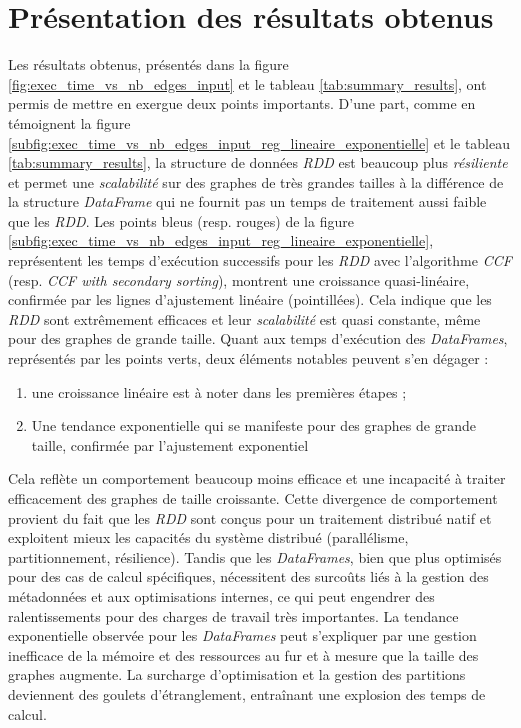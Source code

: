 \documentclass[conference]{IEEEtran}
\begin{document}
\section{Présentation des résultats obtenus}

Les résultats obtenus, présentés dans la figure \ref{fig:exec_time_vs_nb_edges_input} et le tableau \ref{tab:summary_results}, ont permis de mettre en exergue deux points importants.
D'une part, comme en témoignent la figure \ref{subfig:exec_time_vs_nb_edges_input_reg_lineaire_exponentielle} et le tableau \ref{tab:summary_results}, la structure de données \textit{RDD} est beaucoup plus \textit{résiliente} et permet une \textit{scalabilité} sur des graphes de très grandes tailles à la différence de la structure \textit{DataFrame} qui ne fournit pas un temps de traitement aussi faible que les \textit{RDD}.
Les points bleus (resp. rouges) de la figure \ref{subfig:exec_time_vs_nb_edges_input_reg_lineaire_exponentielle}, représentent les temps d'exécution successifs pour les \textit{RDD} avec l'algorithme \textit{CCF} (resp. \textit{CCF with secondary sorting}), montrent une croissance quasi-linéaire, confirmée par les lignes d'ajustement linéaire (pointillées). Cela indique que les \textit{RDD} sont extrêmement efficaces et leur \textit{scalabilité} est quasi constante, même pour des graphes de grande taille.
Quant aux temps d'exécution des \textit{DataFrames}, représentés par les points verts, deux éléments notables peuvent s'en dégager :
\begin{enumerate}
\item une croissance linéaire est à noter dans les premières étapes ;
\item Une tendance exponentielle qui se manifeste pour des graphes de grande taille, confirmée par l'ajustement exponentiel
\end{enumerate}
Cela reflète un comportement beaucoup moins efficace et une incapacité à traiter efficacement des graphes de taille croissante.
Cette divergence de comportement provient du fait que les \textit{RDD} sont conçus pour un traitement distribué natif et exploitent mieux les capacités du système distribué (parallélisme, partitionnement, résilience).
Tandis que les \textit{DataFrames}, bien que plus optimisés pour des cas de calcul spécifiques, nécessitent des surcoûts liés à la gestion des métadonnées et aux optimisations internes, ce qui peut engendrer des ralentissements pour des charges de travail très importantes.
La tendance exponentielle observée pour les \textit{DataFrames} peut s'expliquer par une gestion inefficace de la mémoire et des ressources au fur et à mesure que la taille des graphes augmente.
La surcharge d'optimisation et la gestion des partitions deviennent des goulets d'étranglement, entraînant une explosion des temps de calcul.
\end{document}

